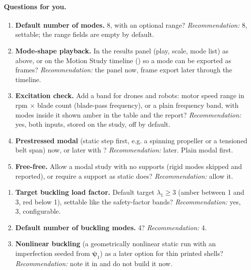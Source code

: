 \paragraph{Questions for you.}
\begin{enumerate}[label=M\arabic*.]
  \item \textbf{Default number of modes.} 8, with an optional range? \emph{Recommendation:} 8, settable;
        the range fields are empty by default.
  \item \textbf{Mode-shape playback.} In the results panel (play, scale, mode list) as above, or on the
        Motion Study timeline () so a mode can be exported as frames? \emph{Recommendation:} the
        panel now, frame export later through the timeline.
  \item \textbf{Excitation check.} Add a band for drones and robots: motor speed range in rpm $\times$ blade
        count (blade-pass frequency), or a plain frequency band, with modes inside it shown amber in the table
        and the report? \emph{Recommendation:} yes, both inputs, stored on the study, off by default.
  \item \textbf{Prestressed modal} (static step first, e.g. a spinning propeller or a tensioned belt
        span) now, or later with ? \emph{Recommendation:} later. Plain modal first.
  \item \textbf{Free-free.} Allow a modal study with no supports (rigid modes skipped and reported), or require
        a support as static does? \emph{Recommendation:} allow it.
\end{enumerate}
\begin{enumerate}[label=B\arabic*.]
  \item \textbf{Target buckling load factor.} Default target $\lambda_1\ge3$ (amber between 1 and 3, red
        below 1), settable like the safety-factor bands? \emph{Recommendation:} yes, 3, configurable.
  \item \textbf{Default number of buckling modes.} 4? \emph{Recommendation:} 4.
  \item \textbf{Nonlinear buckling} (a geometrically nonlinear static run with an imperfection seeded from
        $\boldsymbol\psi_1$) as a later option for thin printed shells? \emph{Recommendation:} note it in
         and do not build it now.
\end{enumerate}

